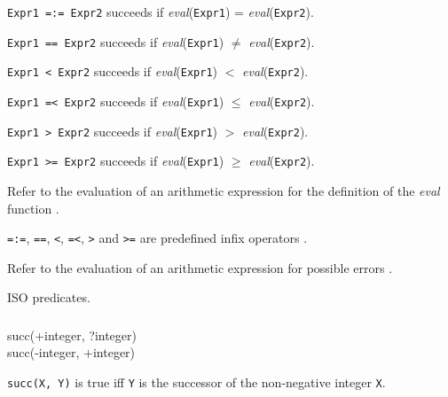 \Description

\texttt{Expr1 =:= Expr2} succeeds if \textit{eval}(\texttt{Expr1}) =
\textit{eval}(\texttt{Expr2}).

\texttt{Expr1 ={\bs}= Expr2} succeeds if \textit{eval}(\texttt{Expr1})
$\neq$ \textit{eval}(\texttt{Expr2}).

\texttt{Expr1 < Expr2} succeeds if \textit{eval}(\texttt{Expr1}) $<$
\textit{eval}(\texttt{Expr2}).

\texttt{Expr1 =< Expr2} succeeds if \textit{eval}(\texttt{Expr1})
$\leq$ \textit{eval}(\texttt{Expr2}).

\texttt{Expr1 > Expr2} succeeds if \textit{eval}(\texttt{Expr1}) $>$
\textit{eval}(\texttt{Expr2}).

\texttt{Expr1 >= Expr2} succeeds if \textit{eval}(\texttt{Expr1})
$\geq$ \textit{eval}(\texttt{Expr2}).

Refer to the evaluation of an arithmetic expression for the definition of
the \textit{eval} function .

\texttt{=:=}, \texttt{={\bs}=}, \texttt{<}, \texttt{=<},
\texttt{>} and \texttt{>=} are predefined infix operators
.

\Errors

Refer to the evaluation of an arithmetic expression for possible errors
.

\Portability

ISO predicates.



\subsubsection{}

\begin{TemplatesOneCol}
succ(+integer, ?integer) \\
succ(-integer, +integer) 

\end{TemplatesOneCol}

\Description

\texttt{succ(X, Y)} is true iff \texttt{Y} is the successor of the non-negative integer \texttt{X}. 

\begin{PlErrors}






\end{PlErrors}

